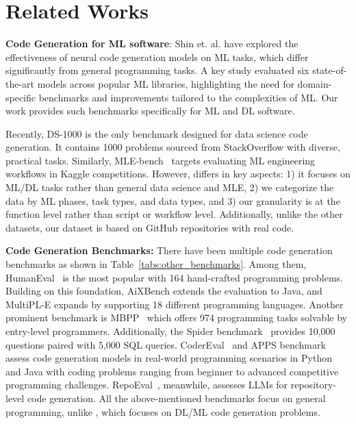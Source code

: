 \section{Related Works}
\textbf{Code Generation for ML software}: Shin et. al.\cite{shin2023good} have explored the effectiveness of neural code generation models on ML tasks, which differ significantly from general programming tasks. A key study evaluated six state-of-the-art models across popular ML libraries, highlighting the need for domain-specific benchmarks and improvements tailored to the complexities of ML. Our work provides such benchmarks specifically for ML and DL software.

Recently, DS-1000\cite{lai2023ds} is the only benchmark designed for data science code generation. It contains 1000 problems sourced from 
StackOverflow with
diverse, practical tasks. Similarly, MLE-bench~\cite{chan2024mle} targets evaluating ML engineering workflows in Kaggle competitions.
However, \tool differs in key aspects: 1) it focuses on ML/DL tasks rather than general data science and MLE, 2) we categorize the data by ML phases, task types, and data types, and 3) our granularity is at the function level rather than script or workflow level. Additionally, unlike the other datasets, our dataset is based on GitHub repositories with real code.

\textbf{Code Generation Benchmarks: } There have been multiple code generation benchmarks as shown in Table~\ref{tabs:other_benchmarks}.
Among them, HumanEval~\cite{chen2021evaluating} is the most popular
with 164 hand-crafted programming problems.
Building on this foundation, AiXBench\cite{hao2022aixbench} extends the evaluation to Java, and MultiPL-E\cite{cassano2022multipl} expands
by supporting 18 different programming languages.
Another prominent benchmark is MBPP~\cite{austin2021program} which offers 974 programming tasks solvable by entry-level programmers.
Additionally, the Spider benchmark~\cite{yu2018spider} provides 10,000 questions paired with 5,000 SQL queries. 
CoderEval~\cite{yu2024codereval} and APPS benchmark~\cite{hendrycks2measuring} assess code generation models in real-world programming scenarios in Python and Java with coding problems ranging from beginner to advanced competitive programming challenges. RepoEval~\cite{zhang2023repocoder}, meanwhile, assesses LLMs for repository-level code generation. All the above-mentioned benchmarks focus on general programming, unlike \tool, which focuses on DL/ML code generation problems.

